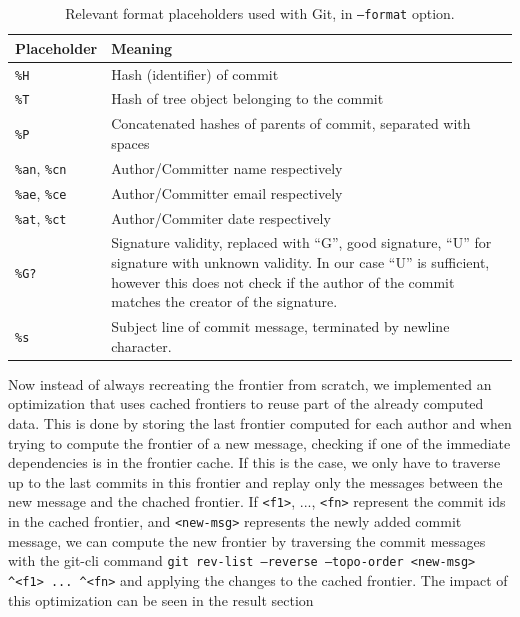 \documentclass{article}
\begin{document}
\begin{table}[ht]
    \centering
    \begin{tabular}{|l|p{8cm}|}
        \hline
        \textbf{Placeholder} & \textbf{Meaning} \\ \hline
        \texttt{\%H} & Hash (identifier) of commit\\ \hline
        \texttt{\%T} & Hash of tree object belonging to the commit\\ \hline
        \texttt{\%P} & Concatenated hashes of parents of commit, separated with spaces\\ \hline
        \texttt{\%an}, \texttt{\%cn} & Author/Committer name respectively\\ \hline
        \texttt{\%ae}, \texttt{\%ce} & Author/Committer email respectively\\ \hline
        \texttt{\%at}, \texttt{\%ct} & Author/Commiter date respectively\\ \hline
        \texttt{\%G?} & Signature validity, replaced with ``G'',  good signature, ``U'' for signature with unknown validity. In our case ``U'' is sufficient, however this does not check if the author of the commit matches the creator of the signature.\\ \hline
        \texttt{\%s} & Subject line of commit message, terminated by newline character.\\ \hline
    \end{tabular}
    \caption{Relevant format placeholders used with Git, in \texttt{--format} option.}
    \label{tab:git-format-placeholders}
\end{table}

Now instead of always recreating the frontier from scratch, we implemented an optimization that uses cached frontiers to reuse part of the already computed data. This is done by storing the last frontier computed for each author and when trying to compute the frontier of a new message, checking if one of the immediate dependencies is in the frontier cache. If this is the case, we only have to traverse up to the last commits in this frontier and replay only the messages between the new message and the chached frontier. If \texttt{<f1>}, ..., \texttt{<fn>} represent the commit ids in the cached frontier, and \texttt{<new-msg>} represents the newly added commit message, we can compute the new frontier by traversing the commit messages with the git-cli command \texttt{git rev-list --reverse --topo-order <new-msg> \^{}<f1> ... \^{}<fn>} and applying the changes to the cached frontier.
The impact of this optimization can be seen in the result section 
\end{document}
